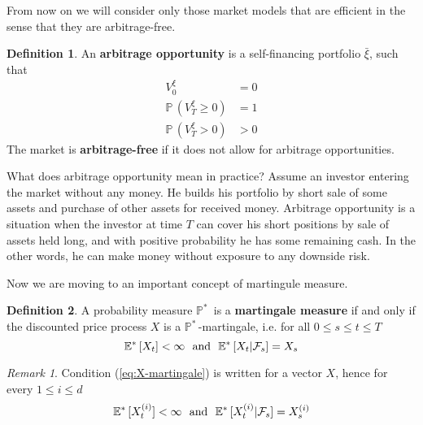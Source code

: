 \documentclass[a4paper,12pt, oneside]{book}
\theoremstyle{definition}
\newtheorem{mydef}{Definition}[section]
\theoremstyle{remark}
\newtheorem{remark}{Remark}
\def\P{{\mathbb{P}}\,}
\def\Em{{\mathbb{E}^*}\,}
\def\Pm{{\mathbb{P}}^*\,}
\def\xia{\bar{\xi}}
\begin{document}
From now on we will consider only those market models that are efficient in the sense that they are arbitrage-free.
\begin{mydef}
 An \textbf{arbitrage opportunity} is a self-financing portfolio $\xia$, such that
 \begin{align*}
  V^{\xi}_0 &= 0\\
  \P(V^{\xi}_T \geq 0) &= 1\\
  \P(V^{\xi}_T > 0 ) &> 0
 \end{align*}
 The market is \textbf{arbitrage-free} if it does not allow for arbitrage opportunities.
\end{mydef}
What does arbitrage opportunity mean in practice? Assume an investor entering the market without any money. He builds his portfolio by short sale of some assets and purchase of other assets for received money. Arbitrage opportunity is a situation when the investor at time $T$ can cover his short positions by sale of assets held long, and with positive probability he has some remaining cash. In the other words, he can make money without exposure to any downside risk. 

Now we are moving to an important concept of martingule measure.
\begin{mydef}
 A probability measure $\Pm$ is a \textbf{martingale measure} if and only if the discounted price process $X$ is a $\Pm$-martingale, i.e. for all  $0 \leq s \leq t \leq T$
 \begin{equation}
  \label{eq:X-martingale}
  \Em[X_t] < \infty \hbox{\ \ and\ \ } \Em[X_t | \mathcal{F}_s] = X_s
 \end{equation}
\end{mydef}

\begin{remark}
 Condition (\ref{eq:X-martingale}) is written for a vector $X$, hence for every $1 \leq i \leq d$
  \begin{equation*}
  \Em[X^{(i)}_t] < \infty \hbox{\ \ and\ \ } \Em[X^{(i)}_t | \mathcal{F}_s] = X^{(i)}_s
 \end{equation*}
\end{remark}
\end{document}
